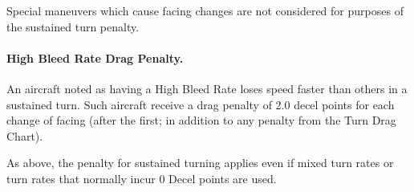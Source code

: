 Special maneuvers which cause facing changes are not considered for purposes of the sustained turn penalty. 

\paragraph{High Bleed Rate Drag Penalty.} An aircraft noted as having a High Bleed Rate loses speed faster than others in a sustained turn. Such aircraft receive a drag penalty of 2.0 decel points for each change of facing (after the first; in addition to any penalty from the Turn Drag Chart).

As above, the penalty for sustained turning applies even if mixed turn rates or turn rates that normally incur 0 Decel points are used.

